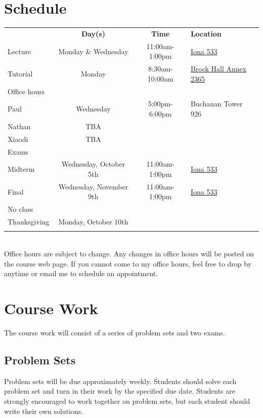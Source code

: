 \documentclass[10pt]{article}
\begin{document}
\section{Schedule}
\begin{tabular}{l c c l}
  \hline 
  & \textbf{Day(s)} & \textbf{Time} & \textbf{Location} \\
  Lecture & Monday \& Wednesday & 11:00am-1:00pm & \href{https://ssc.adm.ubc.ca/classroomservices/function/viewlocation?userEvent=ShowLocation&buildingID=IONA&roomID=533}{Iona 533} \\
  Tutorial & Monday & 8:30am-10:00am &
  \href{https://ssc.adm.ubc.ca/classroomservices/function/viewlocation?userEvent=ShowLocation&buildingID=BRKX&roomID=2365}
  {Brock Hall Annex 2365}  \\
  Office hours \\
  \; Paul & Wednesday & 5:00pm-6:00pm & Buchanan Tower 926 \\
  \; Nathan & TBA & & \\ 
  \; Xiaodi & TBA & & \\ \hline
  Exams \\
  \; Midterm & Wednesday, October 5th & 11:00am-1:00pm & \href{https://ssc.adm.ubc.ca/classroomservices/function/viewlocation?userEvent=ShowLocation&buildingID=IONA&roomID=533}{Iona 533} \\
  \; Final & Wednesday, November 9th & 11:00am-1:00pm & \href{https://ssc.adm.ubc.ca/classroomservices/function/viewlocation?userEvent=ShowLocation&buildingID=IONA&roomID=533}{Iona 533} \\
  No class \\
  \; Thanksgiving & Monday, October 10th \\
  \\ \hline 
\end{tabular} \\
Office hours are subject to change. Any changes in office hours will
be posted on the course web page. If you cannot come to my office
hours, feel free to drop by anytime or email me to schedule an
appointment.  

\section{Course Work}

The course work will consist of a series of problem sets and two
exams. 

\subsection{Problem Sets}
Problem sets will be due approximately weekly.  Students should solve
each problem set and turn in their work by the specified due
date. Students are strongly encouraged to work together on problem
sets, but each student should write their own solutions.
\end{document}
